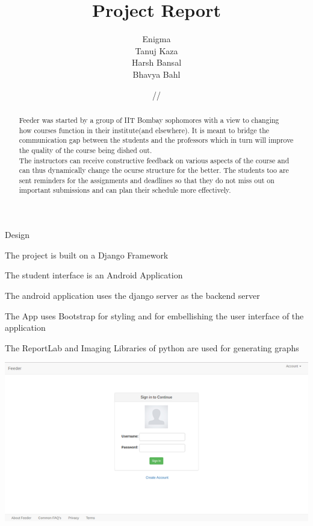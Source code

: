 \documentclass[11pt]{report}
\title{\textbf{Project Report}}
\author{Enigma\\ Tanuj Kaza \\ Harsh Bansal \\ Bhavya Bahl \\}
\date{\oldstylenums{05}/\oldstylenums{11}/\oldstylenums{16}}
\begin{document}
\maketitle 

\begin{abstract}
Feeder was started by a group of IIT Bombay sophomores with a view to changing how courses function in their institute(and elsewhere). It is meant to bridge the communication gap between the students and the professors which in turn will improve the quality of the course being dished out. \\

The instructors can receive constructive feedback on various aspects of the course and can thus dynamically change the ocurse structure for the better. The students too are sent reminders for the assignments and deadlines so that they do not miss out on important submissions and can plan their schedule more effectively.
\end{abstract}

\newpage
\begin{outline}
	\item Design
	\begin{outline}
		\item The project is built on a Django Framework
		\item The student interface is an Android Application
		\item The android application uses the django server as the backend server
		\item The App uses Bootstrap for styling and for embellishing the user interface of the application
		\item The ReportLab and Imaging Libraries of python are used for generating graphs
	\end{outline}
\end{outline}
\includegraphics{Home}
\end{document}
